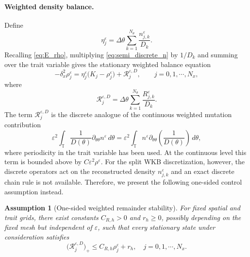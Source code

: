 \documentclass[11pt]{article}
\numberwithin{equation}{section}
\newtheorem{assumption}{Assumption}[section]
\begin{document}
\paragraph{Weighted density balance.}
Define
\begin{equation}\label{def:eta}
    \eta_j^\varepsilon
    =
    \Delta\theta
    \sum_{k=1}^{N_\theta}
    \frac{n_{j,k}^\varepsilon}{D_k}.
\end{equation}
Recalling \eqref{eq:E_rho}, multiplying \eqref{eq:semi_discrete_n} by \(1/D_k\) and summing over the
trait variable gives the stationary weighted balance equation
\begin{equation}\label{eq:weighted_summed_density_stationary}
    -\delta_x^2\rho_j^\varepsilon
    =
    \eta_j^\varepsilon
    \bigl(K_j-\rho_j^\varepsilon\bigr)
    +
    \mathcal R_j^{\varepsilon,D},
    \qquad j=0, 1,\cdots,N_x,
\end{equation}
where
\begin{equation}\label{def:R_D}
    \mathcal R_j^{\varepsilon,D}
    =
    \Delta\theta
    \sum_{k=1}^{N_\theta}
    \frac{R_{j,k}^\varepsilon}{D_k}.
\end{equation}
The term \(\mathcal R_j^{\varepsilon,D}\) is the discrete analogue of the
continuous weighted mutation contribution
\begin{equation}\label{eq:cts_R_expression}
    \varepsilon^2
    \int_{\mathbb T}
    \frac1{D(\theta)}
    \partial_{\theta\theta}n^\varepsilon
    \,d\theta
    =
    \varepsilon^2
    \int_{\mathbb T}
    n^\varepsilon
    \partial_{\theta\theta}\left(\frac1{D(\theta)}\right)
    \,d\theta ,
\end{equation}
where periodicity in the trait variable has been used.  At the continuous
level this term is bounded above by \(C\varepsilon^2\rho^\varepsilon\).  For
the split WKB discretization, however, the discrete operators act on the
reconstructed density
$
    n_{j,k}^\varepsilon
$
and an exact discrete chain rule is not available.  
Therefore, we present the following one-sided control assumption instead.  


\begin{assumption}[One-sided weighted remainder stability]
\label{ass:remainder_stability}
For fixed spatial and trait grids, there exist constants \(C_{R,h}>0\) and \(r_h\ge0\),
possibly depending on the fixed mesh but independent of \(\varepsilon\), such that every
stationary state under consideration satisfies
\begin{equation}\label{eq:remainder_CR_bound}
    \bigl(\mathcal R_j^{\varepsilon,D}\bigr)_+
    \le
    C_{R,h}\rho_j^\varepsilon+r_h,
    \quad j=0,1,\cdots,N_x.
\end{equation}
\end{assumption}
\end{document}

